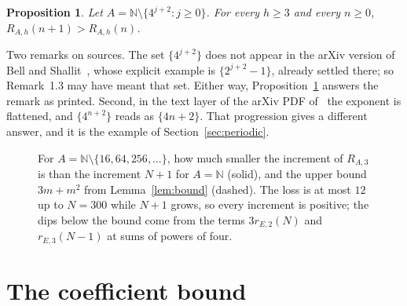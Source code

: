 \documentclass[11pt]{amsart}
\newtheorem{proposition}[theorem]{Proposition}
\theoremstyle{remark}
\newcommand{\N}{\mathbb{N}}
\begin{document}
\begin{proposition}\label{prop:main}
Let $A=\N\setminus\{4^{j+2}:j\ge0\}$. For every $h\ge3$ and every $n\ge0$, $R_{A,h}(n+1)>R_{A,h}(n)$.
\end{proposition}

Two remarks on sources. The set $\{4^{j+2}\}$ does not appear in the arXiv version of Bell and Shallit~\cite{BS}, whose explicit example is $\{2^{j+2}-1\}$, already settled there; so Remark~1.3 may have meant that set. Either way, Proposition~\ref{prop:main} answers the remark as printed. Second, in the text layer of the arXiv PDF of~\cite{SY} the exponent is flattened, and $\{4^{n+2}\}$ reads as $\{4n+2\}$. That progression gives a different answer, and it is the example of Section~\ref{sec:periodic}.

\begin{figure}[ht]
\centering
{}
\caption{For $A=\N\setminus\{16,64,256,\dots\}$, how much smaller the increment of $R_{A,3}$ is than the increment $N+1$ for $A=\N$ (solid), and the upper bound $3m+m^2$ from Lemma~\ref{lem:bound} (dashed). The loss is at most $12$ up to $N=300$ while $N+1$ grows, so every increment is positive; the dips below the bound come from the terms $3r_{E,2}(N)$ and $r_{E,3}(N-1)$ at sums of powers of four.}
\label{fig:diff}
\end{figure}

\section{The coefficient bound}
\end{document}
